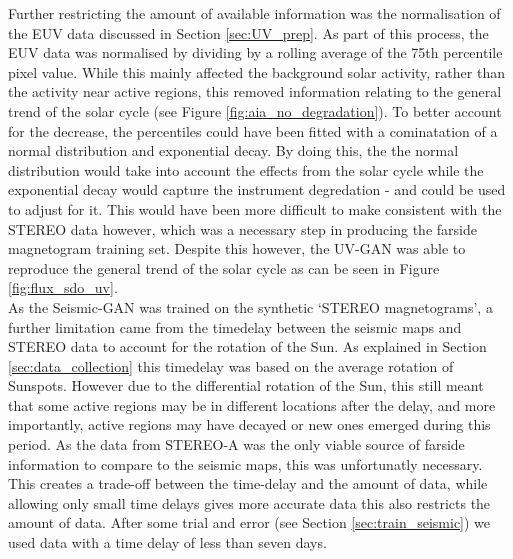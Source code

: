\documentclass[11pt,a4paper,onecolumn]{report}
\begin{document}
Further restricting the amount of available information was the normalisation of
the EUV data discussed in Section \ref{sec:UV_prep}. As part of this process,
the EUV data was normalised by dividing by a rolling average of the 75th
percentile pixel value. While this mainly affected the background solar
activity, rather than the activity near active regions, this removed information
relating to the general trend of the solar cycle (see Figure
\ref{fig:aia_no_degradation}). To better account for the decrease, the
percentiles could have been fitted with a cominatation of a normal distribution
and exponential decay. By doing this, the the normal distribution would take
into account the effects from the solar cycle while the exponential decay would
capture the instrument degredation - and could be used to adjust for it. This
would have been more difficult to make consistent with the STEREO data however,
which was a necessary step in producing the farside magnetogram training set.
Despite this however, the UV-GAN was able to reproduce the general trend of the
solar cycle as can be seen in Figure \ref{fig:flux_sdo_uv}. \\


As the Seismic-GAN was trained on the synthetic `STEREO magnetograms', a further
limitation came from the timedelay between the seismic maps and STEREO data to
account for the rotation of the Sun. As explained in Section
\ref{sec:data_collection} this timedelay was based on the average rotation of
Sunspots. However due to the differential rotation of the Sun, this still meant
that some active regions may be in different locations after the delay, and more
importantly, active regions may have decayed or new ones emerged during this
period. As the data from STEREO-A was the only viable source of farside
information to compare to the seismic maps, this was unfortunatly necessary.
This creates a trade-off between the time-delay and the amount of data, while
allowing only small time delays gives more accurate data this also restricts the
amount of data. After some trial and error (see Section \ref{sec:train_seismic})
we used data with a time delay of less than seven days. \\
\end{document}
